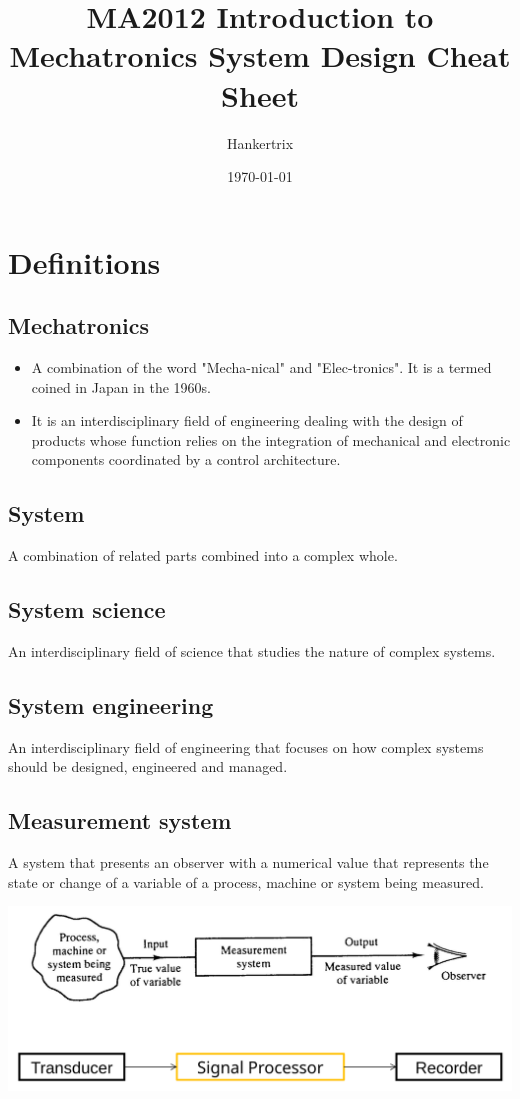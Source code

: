 \documentclass[11pt]{article}
\author{Hankertrix}
\date{\today}
\title{MA2012 Introduction to Mechatronics System Design Cheat Sheet}
\begin{document}
\maketitle
\setcounter{tocdepth}{2}
\tableofcontents \clearpage
\section{Definitions}
\label{sec:orga227055}

\subsection{Mechatronics}
\label{sec:org7296c53}
\begin{itemize}
\item A combination of the word "Mecha-nical" and "Elec-tronics". It is a termed coined in Japan in the 1960s.
\item It is an interdisciplinary field of engineering dealing with the design of products whose function relies on the integration of mechanical and electronic components coordinated by a control architecture.
\end{itemize}

\subsection{System}
\label{sec:orgcec563f}
A combination of related parts combined into a complex whole.

\subsection{System science}
\label{sec:orge2808a0}
An interdisciplinary field of science that studies the nature of complex systems.

\subsection{System engineering}
\label{sec:org0879029}
An interdisciplinary field of engineering that focuses on how complex systems should be designed, engineered and managed.

\subsection{Measurement system}
\label{sec:org5330491}
A system that presents an observer with a numerical value that represents the state or change of a variable of a process, machine or system being measured.
\begin{center}
\includegraphics[width=.9\linewidth]{./images/measurement-system.png}
\end{center}
\end{document}
